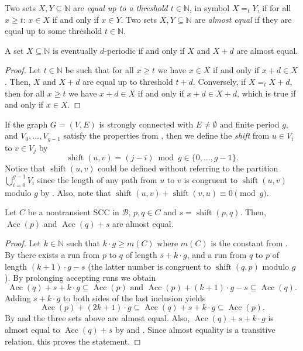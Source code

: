 \documentclass{theoretics}
\newcommand{\N}{\mathbb{N}}
\newcommand{\B}{\mathcal{B}}
\DeclareMathOperator{\shift}{shift}
\DeclareMathOperator{\Acc}{Acc}
\renewcommand{\geq}{\geqslant}
\renewcommand{\ge}{\geq}
\begin{document}
Two sets $X,Y \subseteq \N$ are {\em equal up to a threshold $t \in \N$}, in symbol $X =_t Y$, if for all $x \geq t$:
$x \in X$ if and only if $x \in Y$. Two sets $X,Y \subseteq \N$ are {\em almost equal} if they are equal up to some threshold $t \in \N$. 

\begin{lemma}
	\label{lem:ae}
	A set $X \subseteq \N$ is eventually $d$-periodic if and only if $X$ and $X+d$ are almost equal.
\end{lemma}
\begin{proof}
Let $t \in \N$ be such that for all $x \ge t$ we have $x \in X$ if and only if $x + d \in X$. Then, $X$ and $X + d$ are equal up to threshold $t+d$. Conversely, if $X =_t X+d$, then for all $x \ge t$ we have $x + d \in X$ if and only if $x + d \in X+d$, which is true if and only if $x \in X$.
\end{proof}

If the graph $G = (V,E)$ is strongly connected with $E \neq \emptyset$ and finite period $g$,
and $V_0, \ldots, V_{g-1}$ satisfy the properties from , then
we define the {\em shift} from $u \in V_i$ to $v \in V_j$
by
\begin{equation}\label{shift}
\shift(u,v) = (j-i) \bmod g \in \{0, \dots, g-1\}.
\end{equation}
Notice that $\shift(u,v)$ could be defined without referring to the partition $\bigcup_{i=0}^{g-1} V_i$ 
since the length of any path from $u$ to $v$ is congruent to $\shift(u,v)$ modulo $g$
by .  Also, note that $\shift(u,v) + \shift(v,u) \equiv 0 \pmod g$.

\begin{lemma}
\label{lem:con-run}
Let $C$ be a nontransient SCC in $\B$, $p,q \in C$ and $s = \shift(p,q)$.
Then, $\Acc(p)$ and $\Acc(q) + s$ are almost equal.
\end{lemma}

\begin{proof}
	Let $k \in \N$ such that $k \cdot g \ge m(C)$ where $m(C)$ is the constant from .
	By  there exists a run from $p$ to $q$ of length $s + k \cdot g$,
	and a run from $q$ to $p$ of length $(k+1) \cdot g - s$ (the latter number is congruent 
	to $\shift(q,p)$ modulo $g$).
	By prolonging accepting runs we obtain
	\[
		\Acc(q) + s + k \cdot g \subseteq \Acc(p) \mbox{ and } \Acc(p) + (k+1) \cdot g - s \subseteq \Acc(q).
	\]
	Adding $s + k \cdot g$ to both sides of the last inclusion yields
	\[
		\Acc(p) + (2k+1) \cdot g \subseteq \Acc(q) + s + k \cdot g \subseteq \Acc(p).
	\]
	By  and  the three sets above are almost equal.
	Also, $\Acc(q) + s + k \cdot g$ is almost equal to $\Acc(q) + s$
	by  and . Since almost equality is a transitive relation,
	this proves the statement.
\end{proof}
\end{document}
